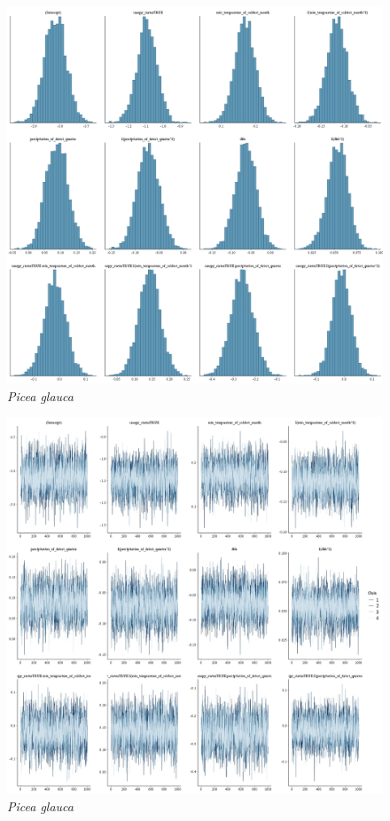 \documentclass[letterpaper, 12pt]{article}
\begin{document}
\begin{figure}
	\centering
	\includegraphics[scale=0.4]{./183295-PIC-GLA_hist}
	\caption{\textit{Picea glauca}}
\end{figure}

\begin{figure}
	\centering
	\includegraphics[scale=0.4]{./183295-PIC-GLA_traces}
	\caption{\textit{Picea glauca}}
\end{figure}
\end{document}
